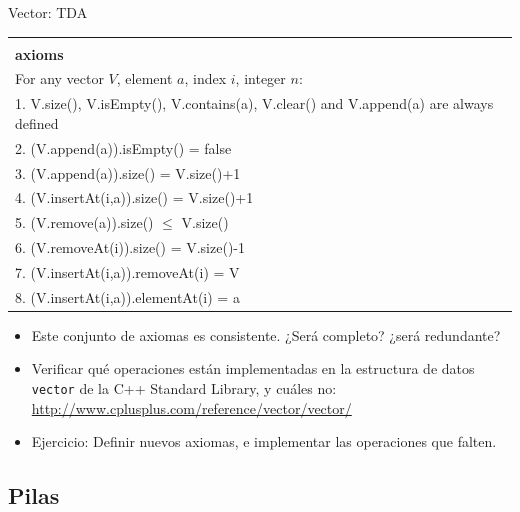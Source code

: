 \documentclass{beamer} %
\begin{document}
\begin{frame}{Vector: TDA}
    \scriptsize{
    \begin{tabular}{p{87ex}}\hline\\[-1ex]
      {\bf\normalsize axioms}\\
      For any vector $V$, element $a$, index $i$, integer $n$:\\[1.2ex]
      1. V.size(), V.isEmpty(), V.contains(a), V.clear() and V.append(a) are always defined\\
      2. (V.append(a)).isEmpty() = false\\
      3. (V.append(a)).size() = V.size()+1\\
      4. (V.insertAt(i,a)).size() = V.size()+1\\
      5. (V.remove(a)).size() $\leq$ V.size()\\
      6. (V.removeAt(i)).size() = V.size()-1\\
      7. (V.insertAt(i,a)).removeAt(i) = V\\
      8. (V.insertAt(i,a)).elementAt(i) = a\\[1.5ex]\hline
    \end{tabular}

    \begin{itemize}
        \item<2-> Este conjunto de axiomas es consistente. ¿Será completo? ¿será redundante?
        \item<3-> Verificar qué operaciones están implementadas en la estructura de datos \texttt{vector} de la C++ Standard Library, y cuáles no: \url{http://www.cplusplus.com/reference/vector/vector/}
        \item<4-> Ejercicio: Definir nuevos axiomas, e implementar las operaciones que falten.
    \end{itemize}}
\end{frame}


\subsection{Pilas}
\end{document}

